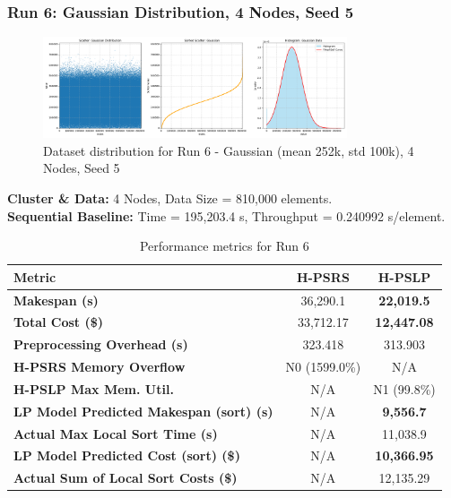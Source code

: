 \documentclass[]{interact}
\theoremstyle{plain}
\theoremstyle{definition}
\theoremstyle{remark}
\begin{document}
\subsubsection{Run 6: Gaussian Distribution, 4 Nodes, Seed 5}

\begin{figure}[H]
    \centering
    \includegraphics[width=0.8\textwidth]{src/out/6run_4node_5seed_gaussian.png}
    \caption{Dataset distribution for Run 6 - Gaussian (mean 252k, std 100k), 4 Nodes, Seed 5}
    \label{fig:run6_dist}
\end{figure}

\textbf{Cluster \& Data:} 4 Nodes, Data Size = 810,000 elements.\\
\textbf{Sequential Baseline:} Time = 195,203.4 \textmu{}s, Throughput = 0.240992 \textmu{}s/element.

\begin{table}[H]
\centering
\caption{Performance metrics for Run 6}
\label{tab:run6}
\begin{tabular}{@{}lcc@{}}
\toprule
\textbf{Metric} & \textbf{H-PSRS} & \textbf{H-PSLP} \\
\midrule
\textbf{Makespan (\textmu{}s)} & 36,290.1 & \textbf{22,019.5} \\
\textbf{Total Cost (\$)} & 33,712.17 & \textbf{12,447.08} \\
\textbf{Preprocessing Overhead (\textmu{}s)} & 323.418 & 313.903 \\
\textbf{H-PSRS Memory Overflow} & N0 (1599.0\%) & N/A \\
\textbf{H-PSLP Max Mem. Util.} & N/A & N1 (99.8\%) \\
\textbf{LP Model Predicted Makespan (sort) (\textmu{}s)} & N/A & \textbf{9,556.7} \\
\textbf{Actual Max Local Sort Time (\textmu{}s)} & N/A & 11,038.9 \\
\textbf{LP Model Predicted Cost (sort) (\$)} & N/A & \textbf{10,366.95} \\
\textbf{Actual Sum of Local Sort Costs (\$)} & N/A & 12,135.29 \\
\bottomrule
\end{tabular}
\end{table}
\end{document}
